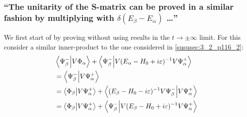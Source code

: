 \subsubsection{\enquote{The unitarity of the S-matrix can be proved in a similar fashion by multiplying  with $\delta\left(E_\beta-E_\alpha\right)$ \dots} }
We first start of by proving  without using results in the $t\rightarrow\pm\infty$ limit. For this consider a similar inner-product to the one considered in \ref{sususec:3_2_p116_2}:
\begin{align*}
	&\braket{\Psi_\beta^-}{V\Phi_\alpha}+\braket{\Psi_\beta^-}{V(E_\alpha-H_0+ i \varepsilon)^{-1}V\Psi_\alpha^+}\\
	&=\braket{\Psi_\beta^-}{V\Psi_\alpha^+}\\
	&=\braket{\Phi_\beta}{V\Psi_\alpha^+}+\braket{(E_\beta-H_0- i \varepsilon)^{-1}V\Psi_\beta^-}{V\Psi_\alpha^+}\\
	&=\braket{\Phi_\beta}{V\Psi_\alpha^+}+\braket{\Psi_\beta^-}{V(E_\beta-H_0+ i \varepsilon)^{-1}V\Psi_\alpha^+}
\end{align*}

